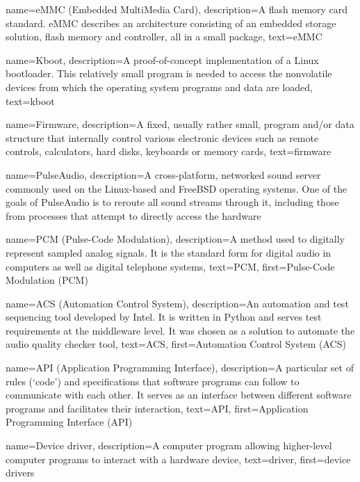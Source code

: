 {
  name=eMMC (Embedded MultiMedia Card),
  description={A flash memory card standard. eMMC describes an
    architecture consisting of an embedded storage solution, flash
    memory and controller, all in a small package},
  text=eMMC
}

{
  name=Kboot,
  description={A proof-of-concept implementation of a Linux
    bootloader. This relatively small program is needed to access the
    nonvolatile devices from which the operating system programs and
    data are loaded},
  text=kboot
}

{
  name=Firmware,
  description={A fixed, usually rather small, program and/or data
    structure that internally control various electronic devices such
    as remote controls, calculators, hard disks, keyboards or memory
    cards},
  text=firmware
}


{
  name=PulseAudio,
  description={A cross-platform, networked sound server commonly used
    on the Linux-based and FreeBSD operating systems. One of the goals
    of PulseAudio is to reroute all sound streams through it,
    including those from processes that attempt to directly access the
    hardware}
}

{
  name=PCM (Pulse-Code Modulation),
  description={A method used to digitally represent sampled analog
    signals. It is the standard form for digital audio in computers as
    well as digital telephone systems},
  text=PCM,
  first=Pulse-Code Modulation (PCM)
}

{
  name=ACS (Automation Control System),
  description={An automation and test sequencing tool developed by
    Intel. It is written in Python and serves test requirements at the
    middleware level. It was chosen as a solution to automate the
    audio quality checker tool},
  text=ACS,
  first=Automation Control System (ACS)
}

{
  name=API (Application Programming Interface),
  description={A particular set of rules (`code') and specifications
    that software programs can follow to communicate with each
    other. It serves as an interface between different software
    programs and facilitates their interaction},
  text=API,
  first=Application Programming Interface (API)
}

{
  name=Device driver,
  description={A computer program allowing higher-level computer
    programs to interact with a hardware device},
  text=driver,
  first=device drivers
}

